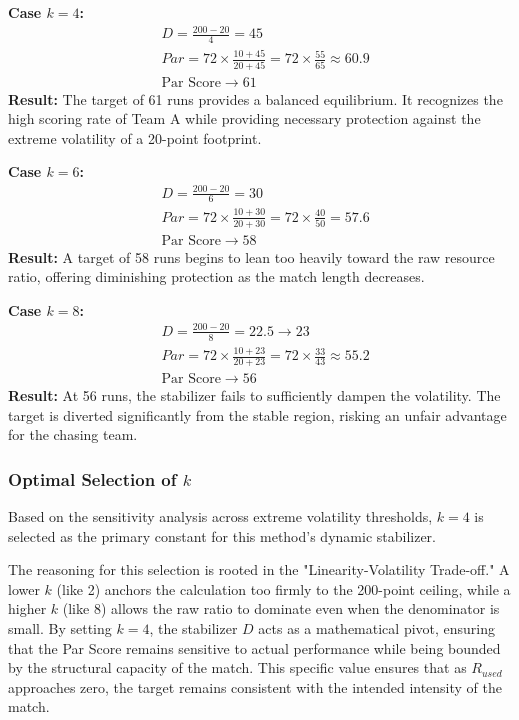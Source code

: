 \documentclass[12pt, letterpaper, fleqn]{article}
\begin{document}
\vspace{1em}
\noindent \textbf{Case $k=4$:}
\begin{align*}
& D = \frac{200 - 20}{4} = 45 \\
& Par = 72 \times \frac{10 + 45}{20 + 45} = 72 \times \frac{55}{65} \approx 60.9 \\
& \text{Par Score} \rightarrow 61
\end{align*}
\indent \textbf{Result:} The target of 61 runs provides a balanced equilibrium. It recognizes the high scoring rate of Team A while providing necessary protection against the extreme volatility of a 20-point footprint.

\vspace{1em}
\noindent \textbf{Case $k=6$:}
\begin{align*}
& D = \frac{200 - 20}{6} = 30 \\
& Par = 72 \times \frac{10 + 30}{20 + 30} = 72 \times \frac{40}{50} = 57.6 \\
& \text{Par Score} \rightarrow 58
\end{align*}
\indent \textbf{Result:} A target of 58 runs begins to lean too heavily toward the raw resource ratio, offering diminishing protection as the match length decreases.

\vspace{1em}
\noindent \textbf{Case $k=8$:}
\begin{align*}
& D = \frac{200 - 20}{8} = 22.5 \rightarrow 23 \\
& Par = 72 \times \frac{10 + 23}{20 + 23} = 72 \times \frac{33}{43} \approx 55.2 \\
& \text{Par Score} \rightarrow 56
\end{align*}
\indent \textbf{Result:} At 56 runs, the stabilizer fails to sufficiently dampen the volatility. The target is diverted significantly from the stable region, risking an unfair advantage for the chasing team.

\subsubsection{Optimal Selection of $k$}

\indent Based on the sensitivity analysis across extreme volatility thresholds, $k=4$ is selected as the primary constant for this method's dynamic stabilizer.

\indent The reasoning for this selection is rooted in the "Linearity-Volatility Trade-off." A lower $k$ (like 2) anchors the calculation too firmly to the 200-point ceiling, while a higher $k$ (like 8) allows the raw ratio to dominate even when the denominator is small. By setting $k=4$, the stabilizer $D$ acts as a mathematical pivot, ensuring that the Par Score remains sensitive to actual performance while being bounded by the structural capacity of the match. This specific value ensures that as $R_{used}$ approaches zero, the target remains consistent with the intended intensity of the match.
\end{document}
